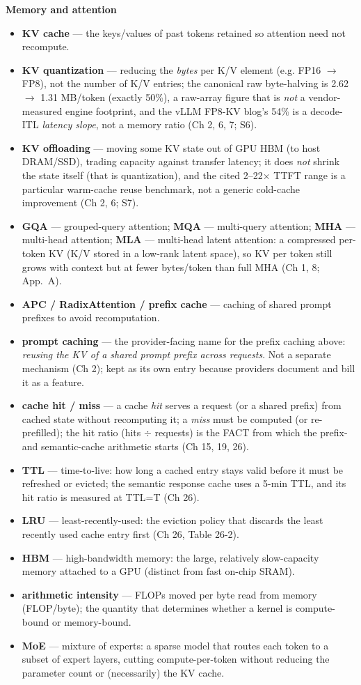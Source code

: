 \noindent\textbf{Memory and attention}
\begin{itemize}\tightlist
\item \textbf{KV cache} — the keys/values of past tokens retained so attention need not recompute.
\item \textbf{KV quantization} — reducing the \emph{bytes} per K/V element (e.g. FP16 $\to$ FP8), not the number of K/V entries; the canonical raw byte-halving is 2.62 $\to$ 1.31 MB/token (exactly 50\%), a raw-array figure that is \emph{not} a vendor-measured engine footprint, and the vLLM FP8-KV blog's 54\% is a decode-ITL \emph{latency slope}, not a memory ratio (Ch 2, 6, 7; S6).
\item \textbf{KV offloading} — moving some KV state out of GPU HBM (to host DRAM/SSD), trading capacity against transfer latency; it does \emph{not} shrink the state itself (that is quantization), and the cited 2--22$\times$ TTFT range is a particular warm-cache reuse benchmark, not a generic cold-cache improvement (Ch 2, 6; S7).
\item \textbf{GQA} — grouped-query attention; \textbf{MQA} — multi-query attention; \textbf{MHA} — multi-head attention; \textbf{MLA} — multi-head latent attention: a compressed per-token KV (K/V stored in a low-rank latent space), so KV per token still grows with context but at fewer bytes/token than full MHA (Ch 1, 8; App.~A).
\item \textbf{APC / RadixAttention / prefix cache} — caching of shared prompt prefixes to avoid recomputation.
\item \textbf{prompt caching} — the provider-facing name for the prefix caching above: \emph{reusing the KV of a shared prompt prefix across requests}. Not a separate mechanism (Ch 2); kept as its own entry because providers document and bill it as a feature.
\item \textbf{cache hit / miss} — a cache \emph{hit} serves a request (or a shared prefix) from cached state without recomputing it; a \emph{miss} must be computed (or re-prefilled); the hit ratio (hits $\div$ requests) is the FACT from which the prefix- and semantic-cache arithmetic starts (Ch 15, 19, 26).
\item \textbf{TTL} — time-to-live: how long a cached entry stays valid before it must be refreshed or evicted; the semantic response cache uses a 5-min TTL, and its hit ratio is measured at TTL=T (Ch 26).
\item \textbf{LRU} — least-recently-used: the eviction policy that discards the least recently used cache entry first (Ch 26, Table 26-2).
\item \textbf{HBM} — high-bandwidth memory: the large, relatively slow-capacity memory attached to a GPU (distinct from fast on-chip SRAM).
\item \textbf{arithmetic intensity} — FLOPs moved per byte read from memory (FLOP/byte); the quantity that determines whether a kernel is compute-bound or memory-bound.
\item \textbf{MoE} — mixture of experts: a sparse model that routes each token to a subset of expert layers, cutting compute-per-token without reducing the parameter count or (necessarily) the KV cache.
\end{itemize}

